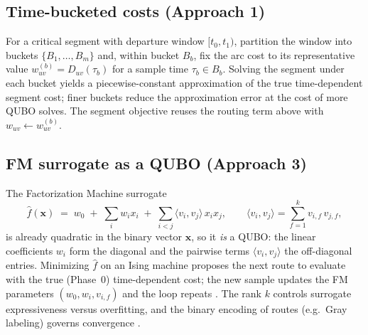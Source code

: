 \documentclass[11pt]{article}
\begin{document}
\subsection{Time-bucketed costs (Approach 1)}
For a critical segment with departure window $[t_0,t_1)$, partition the window into buckets
$\{B_1,\dots,B_m\}$ and, within bucket $B_b$, fix the arc cost to its representative value
$w_{uv}^{(b)} = D_{uv}(\tau_b)$ for a sample time $\tau_b \in B_b$. Solving the segment under
each bucket yields a piecewise-constant approximation of the true time-dependent segment
cost; finer buckets reduce the approximation error at the cost of more QUBO solves. The
segment objective reuses the routing term above with $w_{uv}\!\leftarrow\! w_{uv}^{(b)}$.

\subsection{FM surrogate as a QUBO (Approach 3)}
The Factorization Machine surrogate
\[
  \hat f(\mathbf{x}) \;=\; w_0 \;+\; \sum_{i} w_i x_i \;+\; \sum_{i<j} \langle v_i, v_j\rangle\, x_i x_j,
  \qquad \langle v_i,v_j\rangle = \sum_{f=1}^{k} v_{i,f}\,v_{j,f},
\]
is already quadratic in the binary vector $\mathbf{x}$, so it \emph{is} a QUBO: the linear
coefficients $w_i$ form the diagonal and the pairwise terms $\langle v_i,v_j\rangle$ the
off-diagonal entries. Minimizing $\hat f$ on an Ising machine proposes the next route to
evaluate with the true (Phase~0) time-dependent cost; the new sample updates the FM
parameters $(w_0, w_i, v_{i,f})$ and the loop repeats \cite{kitai2020designing}. The rank
$k$ controls surrogate expressiveness versus overfitting, and the binary encoding of routes
(e.g.\ Gray labeling) governs convergence \cite{koshikawa2024efficient}.
\end{document}
